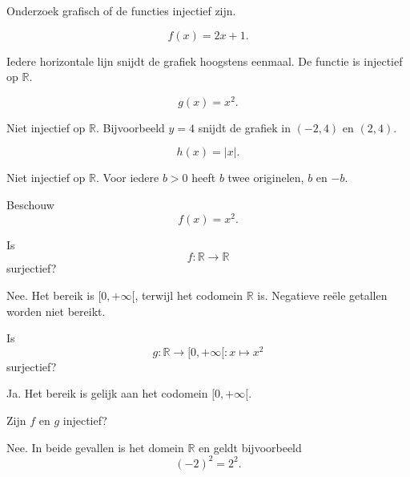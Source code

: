 \documentclass{ximera}
\begin{document}
\begin{oefening}{\oefB\ESS}

Onderzoek grafisch of de functies injectief zijn.

\begin{question}
\[
f(x)=2x+1.
\]

\begin{oplossing}
Iedere horizontale lijn snijdt de grafiek hoogstens eenmaal.
De functie is injectief op \(\mathbb R\).
\end{oplossing}
\end{question}

\begin{question}
\[
g(x)=x^2.
\]

\begin{oplossing}
Niet injectief op \(\mathbb R\). Bijvoorbeeld \(y=4\) snijdt de grafiek
in \((-2,4)\) en \((2,4)\).
\end{oplossing}
\end{question}

\begin{question}
\[
h(x)=|x|.
\]

\begin{oplossing}
Niet injectief op \(\mathbb R\). Voor iedere \(b>0\) heeft \(b\)
twee originelen, \(b\) en \(-b\).
\end{oplossing}
\end{question}

\end{oefening}

\begin{oefening}{\oefB\ESS}

Beschouw
\[
f(x)=x^2.
\]

\begin{question}
Is
\[
f:\mathbb R\to\mathbb R
\]
surjectief?

\begin{oplossing}
Nee. Het bereik is \([0,+\infty[\), terwijl het codomein \(\mathbb R\) is.
Negatieve reële getallen worden niet bereikt.
\end{oplossing}
\end{question}

\begin{question}
Is
\[
g:\mathbb R\to[0,+\infty[:x\mapsto x^2
\]
surjectief?

\begin{oplossing}
Ja. Het bereik is gelijk aan het codomein \([0,+\infty[\).
\end{oplossing}
\end{question}

\begin{question}
Zijn \(f\) en \(g\) injectief?

\begin{oplossing}
Nee. In beide gevallen is het domein \(\mathbb R\) en geldt bijvoorbeeld
\[
(-2)^2=2^2.
\]
\end{oplossing}
\end{question}

\end{oefening}
\end{document}
